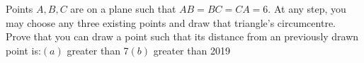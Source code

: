 Points $A,B,C$ are on a plane such that $AB=BC=CA=6$. At any step, you may choose any three existing points and draw that triangle's circumcentre. Prove that you can draw a point such that its distance from an previously drawn point is:$(a)$ greater than 7$(b)$ greater than 2019